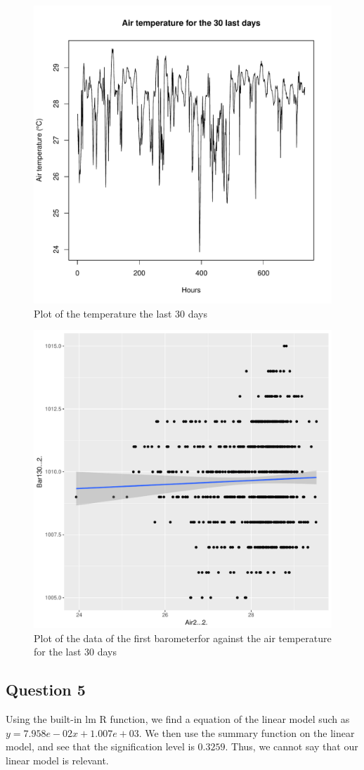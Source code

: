 \documentclass[12pt,a4paper]{article}
\begin{document}
\begin{figure}
    \begin{center}
        \includegraphics[width=0.6\linewidth]{Air2.pdf}
        \caption{Plot of the temperature the last 30 days}
        \label{air2}
    \end{center}
\end{figure}
\begin{figure}
    \begin{center}
        \includegraphics[width=0.6\linewidth]{PresTemp.pdf}
        \caption{Plot of the data of the first barometerfor against the air temperature for the last 30 days}
        \label{prestemp}
    \end{center}
\end{figure}

\subsection*{Question 5}
Using the built-in lm R function, we find a equation of the linear model such as $y = 7.958e-02x + 1.007e+03$. We then use the summary function on the linear model, and see that the signification level is $0.3259$. Thus, we cannot say that our linear model is relevant.
\end{document}
